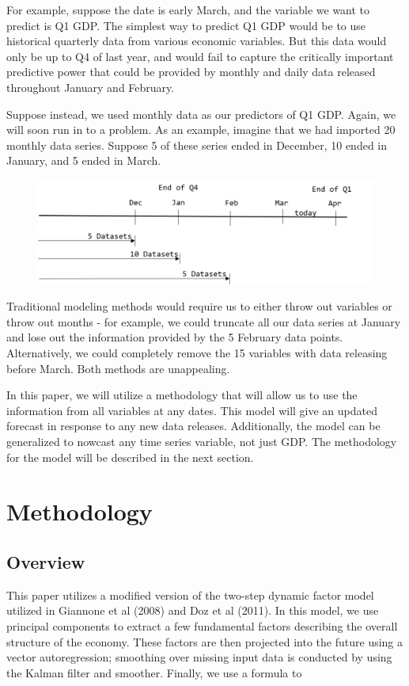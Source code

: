 \documentclass[11pt, letterpaper]{article}\usepackage[]{graphicx}\usepackage[]{color}
\begin{document}
For example, suppose the date is early March, and the variable we want to predict is Q1 GDP. The simplest way to predict Q1 GDP would be to use historical quarterly data from various economic variables. But this data would only be up to Q4 of last year, and would fail to capture the critically important predictive power that could be provided by monthly and daily data released throughout January and February.

Suppose instead, we used monthly data as our predictors of Q1 GDP. Again, we will soon run in to a problem. As an example, imagine that we had imported 20 monthly data series. Suppose 5 of these series ended in December, 10 ended in January, and 5 ended in March. 

\begin{figure}[H]
\includegraphics[scale=.7]{nowcast-time-2}
\centering
\end{figure}

Traditional modeling methods would require us to either throw out variables or throw out months - for example, we could truncate all our data series at January and lose out the information provided by the 5 February data points. Alternatively, we could completely remove the 15 variables with data releasing before March. Both methods are unappealing.

In this paper, we will utilize a methodology that will allow us to use the information from all variables at any dates. This model will give an updated forecast in response to any new data releases. Additionally, the model can be generalized to nowcast any time series variable, not just GDP. The methodology for the model will be described in the next section.
\section{Methodology}

\subsection{Overview}
This paper utilizes a modified version of the two-step dynamic factor model utilized in Giannone et al (2008) and Doz et al (2011). In this model, we use principal components to extract a few fundamental factors describing the overall structure of the economy. These factors are then projected into the future using a vector autoregression; smoothing over missing input data is conducted by using the Kalman filter and smoother. Finally, we use a formula to 
\end{document}
